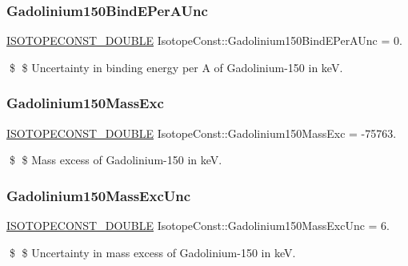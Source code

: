 \subsubsection{\texorpdfstring{Gadolinium150\+Bind\+E\+Per\+A\+Unc}{Gadolinium150BindEPerAUnc}}
{\footnotesize\ttfamily \mbox{\hyperlink{group___isotope_const-_macros_ga8f45a7272ce02c0b4c65c44636ed719a}{I\+S\+O\+T\+O\+P\+E\+C\+O\+N\+S\+T\+\_\+\+D\+O\+U\+B\+LE}} Isotope\+Const\+::\+Gadolinium150\+Bind\+E\+Per\+A\+Unc = 0.}

\$ \$ Uncertainty in binding energy per A of Gadolinium-\/150 in keV. \mbox{\label{group___isotope_const-_gadolinium-_gd150_gac01f3c663c9cbc81546d7ca9b9bd9caa}} 
\subsubsection{\texorpdfstring{Gadolinium150\+Mass\+Exc}{Gadolinium150MassExc}}
{\footnotesize\ttfamily \mbox{\hyperlink{group___isotope_const-_macros_ga8f45a7272ce02c0b4c65c44636ed719a}{I\+S\+O\+T\+O\+P\+E\+C\+O\+N\+S\+T\+\_\+\+D\+O\+U\+B\+LE}} Isotope\+Const\+::\+Gadolinium150\+Mass\+Exc = -\/75763.}

\$ \$ Mass excess of Gadolinium-\/150 in keV. \mbox{\label{group___isotope_const-_gadolinium-_gd150_ga01a3fe375e8dc5fc907fed6a22ec7c18}} 
\subsubsection{\texorpdfstring{Gadolinium150\+Mass\+Exc\+Unc}{Gadolinium150MassExcUnc}}
{\footnotesize\ttfamily \mbox{\hyperlink{group___isotope_const-_macros_ga8f45a7272ce02c0b4c65c44636ed719a}{I\+S\+O\+T\+O\+P\+E\+C\+O\+N\+S\+T\+\_\+\+D\+O\+U\+B\+LE}} Isotope\+Const\+::\+Gadolinium150\+Mass\+Exc\+Unc = 6.}

\$ \$ Uncertainty in mass excess of Gadolinium-\/150 in keV. \mbox{\label{group___isotope_const-_gadolinium-_gd150_gab200d3a14f9fd4317a6c1e216420a6b3}} 
